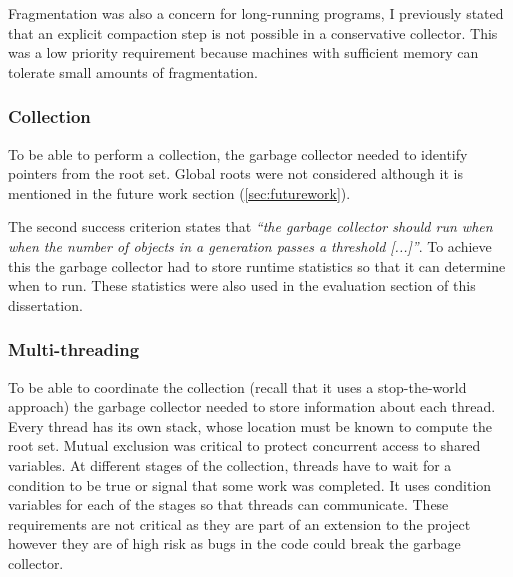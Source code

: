 \documentclass[../diss.tex]{subfiles}
\begin{document}
Fragmentation was also a concern for long-running programs, I previously stated that an explicit compaction step is not possible in a conservative collector. This was a low priority requirement because machines with sufficient memory can tolerate small amounts of fragmentation.

\subsubsection{Collection}

To be able to perform a collection, the garbage collector needed to identify pointers from the root set. Global roots were not considered although it is mentioned in the future work section (\cref{sec:futurework}).

The second success criterion states that \emph{``the garbage collector should run when when the number of objects in a generation passes a threshold [...]''}. To achieve this the garbage collector had to store runtime statistics so that it can determine when to run. These statistics were also used in the evaluation section of this dissertation.

\subsubsection{Multi-threading}

To be able to coordinate the collection (recall that it uses a stop-the-world approach) the garbage collector needed to store information about each thread. Every thread has its own stack, whose location must be known to compute the root set. Mutual exclusion was critical to protect concurrent access to shared variables. At different stages of the collection, threads have to wait for a condition to be true or signal that some work was completed. It uses condition variables for each of the stages so that threads can communicate. These requirements are not critical as they are part of an extension to the project however they are of high risk as bugs in the code could break the garbage collector.
\end{document}
